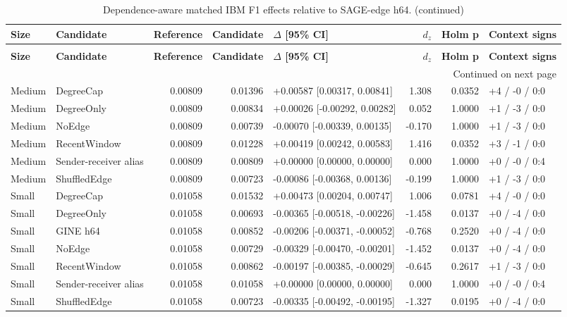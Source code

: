 \begingroup
\footnotesize
\setlength{\tabcolsep}{3pt}
\renewcommand{\arraystretch}{1.10}
\begin{longtable}{@{}p{} p{} r r p{} r r p{}@{}}
\caption{Dependence-aware matched IBM F1 effects relative to SAGE-edge h64.}\label{tab:s-ibm-effect-f1}\\
\toprule
\textbf{Size} & \textbf{Candidate} & \textbf{Reference} & \textbf{Candidate} & \textbf{$\Delta$ [95\% CI]} & \textbf{$d_z$} & \textbf{Holm p} & \textbf{Context signs} \\
\midrule
\endfirsthead
\caption[]{Dependence-aware matched IBM F1 effects relative to SAGE-edge h64. (continued)}\\
\toprule
\textbf{Size} & \textbf{Candidate} & \textbf{Reference} & \textbf{Candidate} & \textbf{$\Delta$ [95\% CI]} & \textbf{$d_z$} & \textbf{Holm p} & \textbf{Context signs} \\
\midrule
\endhead
\midrule
\multicolumn{8}{r}{\footnotesize Continued on next page}\\
\endfoot
\bottomrule
\endlastfoot
Medium & DegreeCap & 0.00809 & 0.01396 & +0.00587 [0.00317, 0.00841] & 1.308 & 0.0352 & +4 / -0 / 0:0 \\
Medium & DegreeOnly & 0.00809 & 0.00834 & +0.00026 [-0.00292, 0.00282] & 0.052 & 1.0000 & +1 / -3 / 0:0 \\
Medium & NoEdge & 0.00809 & 0.00739 & -0.00070 [-0.00339, 0.00135] & -0.170 & 1.0000 & +1 / -3 / 0:0 \\
Medium & RecentWindow & 0.00809 & 0.01228 & +0.00419 [0.00242, 0.00583] & 1.416 & 0.0352 & +3 / -1 / 0:0 \\
Medium & Sender-receiver alias & 0.00809 & 0.00809 & +0.00000 [0.00000, 0.00000] & 0.000 & 1.0000 & +0 / -0 / 0:4 \\
Medium & ShuffledEdge & 0.00809 & 0.00723 & -0.00086 [-0.00368, 0.00136] & -0.199 & 1.0000 & +1 / -3 / 0:0 \\
Small & DegreeCap & 0.01058 & 0.01532 & +0.00473 [0.00204, 0.00747] & 1.006 & 0.0781 & +4 / -0 / 0:0 \\
Small & DegreeOnly & 0.01058 & 0.00693 & -0.00365 [-0.00518, -0.00226] & -1.458 & 0.0137 & +0 / -4 / 0:0 \\
Small & GINE h64 & 0.01058 & 0.00852 & -0.00206 [-0.00371, -0.00052] & -0.768 & 0.2520 & +0 / -4 / 0:0 \\
Small & NoEdge & 0.01058 & 0.00729 & -0.00329 [-0.00470, -0.00201] & -1.452 & 0.0137 & +0 / -4 / 0:0 \\
Small & RecentWindow & 0.01058 & 0.00862 & -0.00197 [-0.00385, -0.00029] & -0.645 & 0.2617 & +1 / -3 / 0:0 \\
Small & Sender-receiver alias & 0.01058 & 0.01058 & +0.00000 [0.00000, 0.00000] & 0.000 & 1.0000 & +0 / -0 / 0:4 \\
Small & ShuffledEdge & 0.01058 & 0.00723 & -0.00335 [-0.00492, -0.00195] & -1.327 & 0.0195 & +0 / -4 / 0:0 \\
\end{longtable}
